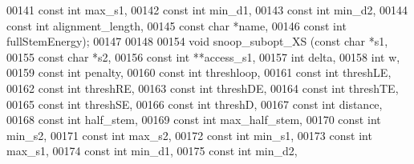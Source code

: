 \begin{DoxyCode}
00141                             \textcolor{keyword}{const} \textcolor{keywordtype}{int} max\_s1,
00142                             \textcolor{keyword}{const} \textcolor{keywordtype}{int} min\_d1,
00143                             \textcolor{keyword}{const} \textcolor{keywordtype}{int} min\_d2,
00144                             \textcolor{keyword}{const} \textcolor{keywordtype}{int} alignment\_length,
00145                             \textcolor{keyword}{const} \textcolor{keywordtype}{char} *name,
00146           \textcolor{keyword}{const} \textcolor{keywordtype}{int} fullStemEnergy);
00147 
00148 
00154 \textcolor{keywordtype}{void} snoop\_subopt\_XS (\textcolor{keyword}{const} \textcolor{keywordtype}{char} *s1,
00155                       \textcolor{keyword}{const} \textcolor{keywordtype}{char} *s2,
00156                       \textcolor{keyword}{const} \textcolor{keywordtype}{int} **access\_s1,
00157                       \textcolor{keywordtype}{int} delta,
00158                       \textcolor{keywordtype}{int} w, 
00159                       \textcolor{keyword}{const} \textcolor{keywordtype}{int} penalty,
00160                       \textcolor{keyword}{const} \textcolor{keywordtype}{int} threshloop, 
00161                       \textcolor{keyword}{const} \textcolor{keywordtype}{int} threshLE,
00162                       \textcolor{keyword}{const} \textcolor{keywordtype}{int} threshRE,
00163                       \textcolor{keyword}{const} \textcolor{keywordtype}{int} threshDE,
00164                       \textcolor{keyword}{const} \textcolor{keywordtype}{int} threshTE,
00165                       \textcolor{keyword}{const} \textcolor{keywordtype}{int} threshSE,
00166                       \textcolor{keyword}{const} \textcolor{keywordtype}{int} threshD,
00167                       \textcolor{keyword}{const} \textcolor{keywordtype}{int} distance,
00168                       \textcolor{keyword}{const} \textcolor{keywordtype}{int} half\_stem,
00169                       \textcolor{keyword}{const} \textcolor{keywordtype}{int} max\_half\_stem,
00170                       \textcolor{keyword}{const} \textcolor{keywordtype}{int} min\_s2,
00171                       \textcolor{keyword}{const} \textcolor{keywordtype}{int} max\_s2,
00172                       \textcolor{keyword}{const} \textcolor{keywordtype}{int} min\_s1,
00173                       \textcolor{keyword}{const} \textcolor{keywordtype}{int} max\_s1,
00174                       \textcolor{keyword}{const} \textcolor{keywordtype}{int} min\_d1,
00175                       \textcolor{keyword}{const} \textcolor{keywordtype}{int} min\_d2,

\end{DoxyCode}

